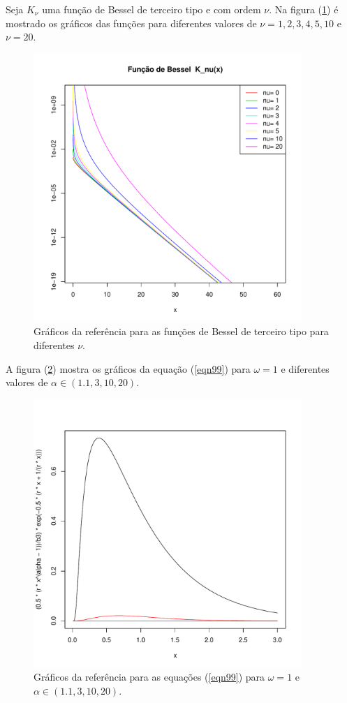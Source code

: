 \documentclass[12pt,a4paper]{article}
\begin{document}
Seja $K_{\nu}$ uma função de Bessel de terceiro tipo e com ordem $\nu$. Na figura (\ref{fig4}) é mostrado os gráficos das funções para diferentes valores de $\nu=1,2,3,4,5,10$ e $\nu=20$. 
\begin{figure}[!htb]
\centering
\includegraphics[width=4.0in]{fun_bessel_nu.pdf}
	\caption{Gráficos da referência \cite{freitas_frery_2005} para as funções de Bessel de terceiro tipo para diferentes $\nu$.}
\label{fig4}
\end{figure}

A figura (\ref{fig5}) mostra os gráficos da equação (\ref{eqn99}) para $\omega=1$ e diferentes valores de $\alpha\in(1.1,3,10,20)$. 

\begin{figure}[!htb]
\centering
\includegraphics[width=4.0in]{fig1_freitas_frery_2005.pdf}
	\caption{Gráficos da referência \cite{freitas_frery_2005} para as equações (\ref{eqn99}) para $\omega=1$ e $\alpha\in(1.1,3,10,20)$.}
\label{fig5}
\end{figure}
\end{document}
